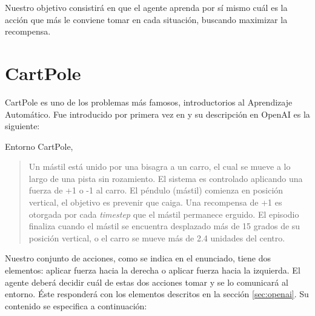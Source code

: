 Nuestro objetivo consistirá en que el agente aprenda por sí mismo cuál es la acción que más le conviene tomar en cada situación, buscando maximizar la recompensa.


\section{CartPole}
\label{cartpole-sec}

CartPole es uno de los problemas más famosos, introductorios al Aprendizaje Automático. Fue introducido por primera vez en \citet{BartoSA83} y su descripción en OpenAI es la siguiente:

%
       {Entorno CartPole, \citet{BartoSA83}}

\begin{quote}
    Un mástil está unido por una bisagra a un carro, el cual se mueve a lo largo de una pista sin rozamiento. El sistema es controlado aplicando una fuerza de +1 o -1 al carro. El péndulo (mástil) comienza en posición vertical, el objetivo es prevenir que caiga. Una recompensa de +1 es otorgada por cada \textit{timestep} que el mástil permanece erguido. El episodio finaliza cuando el mástil se encuentra desplazado más de 15 grados de su posición vertical, o el carro se mueve más de 2.4 unidades del centro.
\end{quote}

Nuestro conjunto de acciones, como se indica en el enunciado, tiene dos elementos: aplicar fuerza hacia la derecha o aplicar fuerza hacia la izquierda. El agente deberá decidir cuál de estas dos acciones tomar y se lo comunicará al entorno. Éste responderá con los elementos descritos en la sección \ref{sec:openai}. Su contenido se especifica a continuación:

